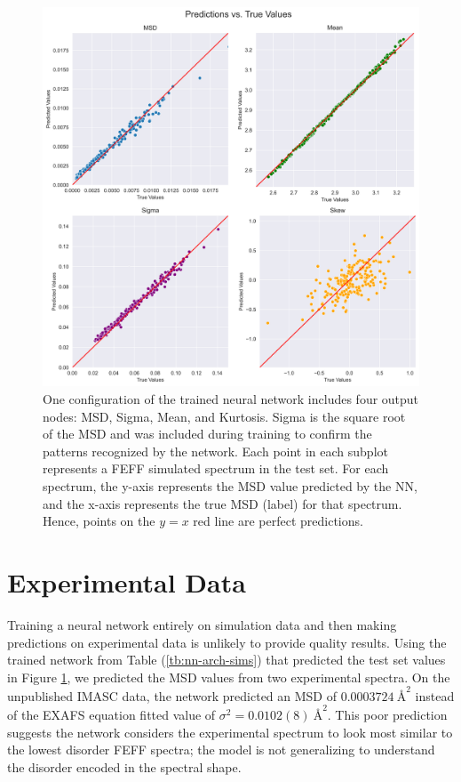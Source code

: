 \begin{figure}
    \centering
    \includegraphics[width=\linewidth]{Chapters/Figures/pa_train-test-fixed.png}
    \caption[Simulation Test Set Predictions]{One configuration of the trained neural network includes four output nodes: MSD, Sigma, Mean, and Kurtosis. Sigma is the square root of the MSD and was included during training to confirm the patterns recognized by the network. Each point in each subplot represents a FEFF simulated spectrum in the test set. For each spectrum, the y-axis represents the MSD value predicted by the NN, and the x-axis represents the true MSD (label) for that spectrum. Hence, points on the $ y=x $ red line are perfect predictions.}
    \label{fig:train-test-split-all4}
\end{figure}

\section{Experimental Data} \label{ch:results}

Training a neural network entirely on simulation data and then making predictions on experimental data is unlikely to provide quality results. Using the trained network from Table (\ref{tb:nn-arch-sims}) that predicted the test set values in Figure \ref{fig:train-test-split-all4}, we predicted the MSD values from two experimental spectra. On the unpublished IMASC data, the network predicted an MSD of $0.0003724~\text{\AA}^2$ instead of the EXAFS equation fitted value of ${\sigma^2=0.0102(8)~\text{\AA}^2}$. This poor prediction suggests the network considers the experimental spectrum to look most similar to the lowest disorder FEFF spectra; the model is not generalizing to understand the disorder encoded in the spectral shape.


